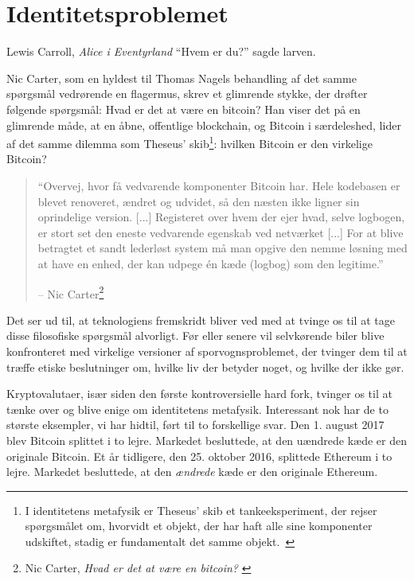 \chapter{Identitetsproblemet}
\label{les:4}

\begin{chapquote}{Lewis Carroll, \textit{Alice i Eventyrland}}
\enquote{Hvem er du?} sagde larven.
\end{chapquote}

Nic Carter, som en hyldest til Thomas Nagels behandling af det samme spørgsmål 
vedrørende en flagermus, skrev et glimrende stykke, der drøfter følgende 
spørgsmål: Hvad er det at være en bitcoin? Han viser det på en glimrende måde, 
at en åbne, offentlige blockchain, og Bitcoin i særdeleshed, lider af det 
samme dilemma som Theseus' skib\footnote{I identitetens metafysik er Theseus' 
skib et tankeeksperiment, der rejser spørgsmålet om, hvorvidt et objekt, der 
har haft alle sine komponenter udskiftet, stadig er fundamentalt det samme 
objekt.~\cite{wiki:theseus}}: hvilken Bitcoin er den virkelige Bitcoin?

\begin{quotation}\begin{samepage}
\enquote{Overvej, hvor få vedvarende komponenter Bitcoin har. Hele 
kodebasen er blevet renoveret, ændret og udvidet, så den næsten ikke ligner 
sin oprindelige version. [...] Registeret over hvem der ejer hvad, selve 
logbogen, er stort set den eneste vedvarende egenskab ved netværket [...]
For at blive betragtet et sandt lederløst system må man opgive den nemme 
løsning med at have en enhed, der kan udpege én kæde (logbog) som den legitime.}
\begin{flushright} -- Nic Carter\footnote{Nic Carter, \textit{Hvad er det at 
    være en bitcoin?} \cite{bitcoin-identity}}
\end{flushright}\end{samepage}\end{quotation}

Det ser ud til, at teknologiens fremskridt bliver ved med at tvinge os til at 
tage disse filosofiske spørgsmål alvorligt. Før eller senere vil selvkørende 
biler blive konfronteret med virkelige versioner af sporvognsproblemet, der 
tvinger dem til at træffe etiske beslutninger om, hvilke liv der betyder noget, 
og hvilke der ikke gør.

Kryptovalutaer, især siden den første kontroversielle hard fork, tvinger os til 
at tænke over og blive enige om identitetens metafysik. Interessant nok har de 
to største eksempler, vi har hidtil, ført til to forskellige svar. Den 1. 
august 2017 blev Bitcoin splittet i to lejre. Markedet besluttede, at den 
uændrede kæde er den originale Bitcoin. Et år tidligere, den 25. oktober 2016, 
splittede Ethereum i to lejre. Markedet besluttede, at den \textit{ændrede} kæde
er den originale Ethereum.


